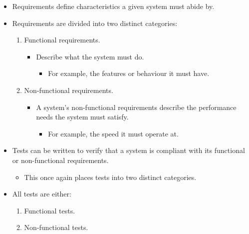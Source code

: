 \documentclass{article}
\begin{document}
\begin{itemize}
\begin{enumerate}
		\item White-box tests.
		\begin{itemize}
			\item Tests programs by using \underline{full} knowledge of the code and its structure.
			\item Can be done as either a dynamic or static test.
			\item Performed when:
			\begin{itemize}
				\item The test must do anything not possible by black-box or grey-box testing.
			\end{itemize}
		\end{itemize}
	\end{enumerate}
	\item Requirements define characteristics a given system must abide by.
	\item Requirements are divided into two distinct categories:
	\begin{enumerate}
		\item Functional requirements.
		\begin{itemize}
			\item Describe what the system must do.
			\begin{itemize}
				\item For example, the features or behaviour it must have.
			\end{itemize}
		\end{itemize}
		\item Non-functional requirements.
		\begin{itemize}
			\item A system's non-functional requirements describe the performance needs the system must satisfy.
			\begin{itemize}
				\item For example, the speed it must operate at.
			\end{itemize}
		\end{itemize}
	\end{enumerate}
	\item Tests can be written to verify that a system is compliant with its functional or non-functional requirements.
	\begin{itemize}
		\item This once again places tests into two distinct categories.
	\end{itemize}
	\item All tests are either:
	\begin{enumerate}
		\item Functional tests.
		\item Non-functional tests.
	\end{enumerate}
\end{itemize}

\ifdefined\iscombined
	\newpage
\else
	
\end{document}
